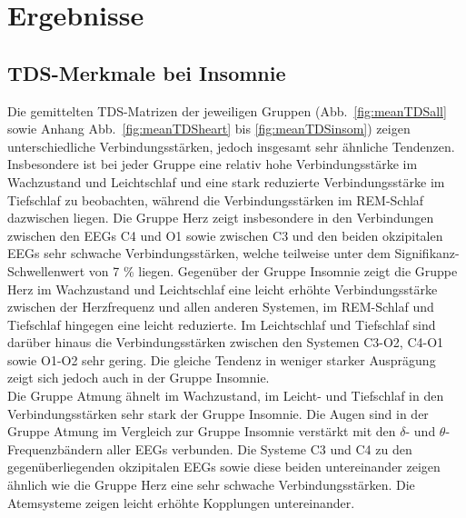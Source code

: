 \chapter{Ergebnisse}

\section{TDS-Merkmale bei Insomnie}

Die gemittelten \acs{TDS}-Matrizen der jeweiligen Gruppen (Abb.~\ref{fig:meanTDSall} sowie Anhang Abb.~\ref{fig:meanTDSheart} bis \ref{fig:meanTDSinsom}) zeigen unterschiedliche Verbindungsstärken, jedoch insgesamt sehr ähnliche Tendenzen. Insbesondere ist bei jeder Gruppe eine relativ hohe Verbindungsstärke im Wachzustand und Leichtschlaf und eine stark reduzierte Verbindungsstärke im Tiefschlaf zu beobachten, während die Verbindungsstärken im \acs{REM}-Schlaf dazwischen liegen. Die Gruppe Herz zeigt insbesondere in den Verbindungen zwischen den \acs{EEG}s C4 und O1 sowie zwischen C3 und den beiden okzipitalen \acs{EEG}s sehr schwache Verbindungsstärken, welche teilweise unter dem Signifikanz-Schwellenwert von 7 \% liegen. Gegenüber der Gruppe Insomnie zeigt die Gruppe Herz im Wachzustand und Leichtschlaf eine leicht erhöhte Verbindungsstärke zwischen der Herzfrequenz und allen anderen Systemen, im \acs{REM}-Schlaf und Tiefschlaf hingegen eine leicht reduzierte. Im Leichtschlaf und Tiefschlaf sind darüber hinaus die Verbindungsstärken zwischen den Systemen C3-O2, C4-O1 sowie O1-O2 sehr gering. Die gleiche Tendenz in weniger starker Ausprägung zeigt sich jedoch auch in der Gruppe Insomnie.\\

Die Gruppe Atmung ähnelt im Wachzustand, im Leicht- und Tiefschlaf in den Verbindungsstärken sehr stark der Gruppe Insomnie. Die Augen sind in der Gruppe Atmung im Vergleich zur Gruppe Insomnie verstärkt mit den $\delta$- und $\theta$-Frequenzbändern aller \acs{EEG}s verbunden. Die Systeme C3 und C4 zu den gegenüberliegenden okzipitalen \acs{EEG}s sowie diese beiden untereinander zeigen ähnlich wie die Gruppe Herz eine sehr schwache Verbindungsstärken. Die Atemsysteme zeigen leicht erhöhte Kopplungen untereinander.\\

